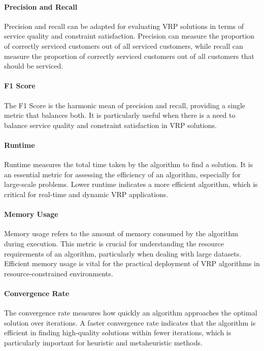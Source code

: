 \documentclass[
]{article}
\begin{document}
  \paragraph{Precision and Recall} Precision and recall can be adapted for evaluating VRP solutions in terms of service quality and constraint satisfaction. Precision can measure the proportion of correctly serviced customers out of all serviced customers, while recall can measure the proportion of correctly serviced customers out of all customers that should be serviced.
  
  \paragraph{F1 Score} The F1 Score is the harmonic mean of precision and recall, providing a single metric that balances both. It is particularly useful when there is a need to balance service quality and constraint satisfaction in VRP solutions.
  
  \paragraph{Runtime} Runtime measures the total time taken by the algorithm to find a solution. It is an essential metric for assessing the efficiency of an algorithm, especially for large-scale problems. Lower runtime indicates a more efficient algorithm, which is critical for real-time and dynamic VRP applications.
  
  \paragraph{Memory Usage} Memory usage refers to the amount of memory consumed by the algorithm during execution. This metric is crucial for understanding the resource requirements of an algorithm, particularly when dealing with large datasets. Efficient memory usage is vital for the practical deployment of VRP algorithms in resource-constrained environments.
  
  \paragraph{Convergence Rate} The convergence rate measures how quickly an algorithm approaches the optimal solution over iterations. A faster convergence rate indicates that the algorithm is efficient in finding high-quality solutions within fewer iterations, which is particularly important for heuristic and metaheuristic methods.
  
\end{document}
